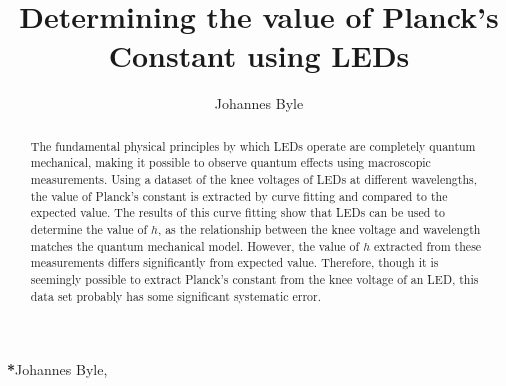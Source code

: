 \documentclass[12pt]{spieman}  %
\title{Determining the value of Planck's Constant using LEDs}
\author{Johannes Byle}
\affil{Wheaton College, Physics and Astronomy, 501 College Ave, Wheaton, USA, 60187}
\begin{document}
    \maketitle

    \begin{abstract}
        The fundamental physical principles by which LEDs operate are completely quantum mechanical, making it
        possible to observe quantum effects using macroscopic measurements.
        Using a dataset of the knee voltages of LEDs at different wavelengths, the value of Planck's constant is
        extracted by curve fitting and compared to the expected value.
        The results of this curve fitting show that LEDs can be used to determine the value of $h$, as the
        relationship between the knee voltage and wavelength matches the quantum mechanical model.
        However, the value of $h$ extracted from these measurements differs significantly from expected value.
        Therefore, though it is seemingly possible to extract Planck's constant from the knee voltage of an LED, this
        data set probably has some significant systematic error.
    \end{abstract}


    {\noindent \footnotesize\textbf{*}Johannes Byle, }
\end{document}
